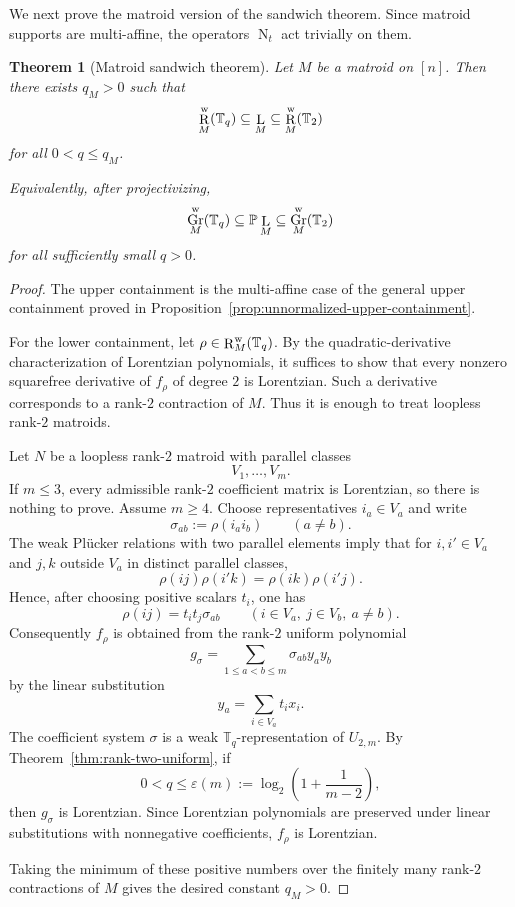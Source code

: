 \documentclass[12pt]{amsart}
\newtheorem{theorem}{Theorem}[section]
\theoremstyle{definition}
\newcommand{\1}{\mathbf{1}}
\DeclareMathOperator{\upN}{N}   %
\DeclareMathOperator{\upL}{L}   %
\DeclareMathOperator{\upR}{R}   %
\DeclareMathOperator{\Gr}{Gr}
\newcommand\T{{\mathbb T}}
\newcommand{\mk}[2][]{\todo[color=orange, #1]{\textbf{Mario}: #2}}
\begin{document}
We next prove the matroid version of the sandwich theorem.  Since matroid
supports are multi-affine, the operators $\upN_t$ act trivially on them.

\begin{theorem}[Matroid sandwich theorem]
\label{thm:matroid-sandwich}
Let $M$ be a matroid on $[n]$.  Then there exists $q_M>0$ such that
\[
\upR_M^{\rm w}(\T_q)\subseteq \upL_M \subseteq \upR_M^{\rm w}(\T_2)
\]
for all $0<q\le q_M$.

Equivalently, after projectivizing,
\[
\Gr_M^{\rm w}(\T_q)\subseteq \mathbb P\upL_M
\subseteq \Gr_M^{\rm w}(\T_2)
\]
for all sufficiently small $q>0$.
\end{theorem}

\begin{proof}
The upper containment is the multi-affine case of the general upper containment
proved in Proposition~\ref{prop:unnormalized-upper-containment}.

For the lower containment, let $\rho\in \upR_M^{\rm w}(\T_q)$.  By the
quadratic-derivative characterization of Lorentzian polynomials, it suffices to
show that every nonzero squarefree derivative of $f_\rho$ of degree $2$ is
Lorentzian.  Such a derivative corresponds to a rank-$2$ contraction of $M$.
Thus it is enough to treat loopless rank-$2$ matroids.

Let $N$ be a loopless rank-$2$ matroid with parallel classes
\[
V_1,\ldots,V_m.
\]
If $m\le 3$, every admissible rank-$2$ coefficient matrix is Lorentzian, so there
is nothing to prove.  Assume $m\ge 4$.  Choose representatives $i_a\in V_a$ and
write
\[
\sigma_{ab}:=\rho(i_ai_b)
\qquad (a\ne b).
\]
The weak Pl\"ucker relations with two parallel elements imply that for
$i,i'\in V_a$ and $j,k$ outside $V_a$ in distinct parallel classes,
\[
\rho(ij)\rho(i'k)=\rho(ik)\rho(i'j).
\]
Hence, after choosing positive scalars $t_i$, one has
\[
\rho(ij)=t_i t_j\sigma_{ab}
\qquad
(i\in V_a,\ j\in V_b,\ a\ne b).
\]
Consequently $f_\rho$ is obtained from the rank-$2$ uniform polynomial
\[
g_\sigma=\sum_{1\le a<b\le m}\sigma_{ab} y_ay_b
\]
by the linear substitution
\[
y_a=\sum_{i\in V_a} t_i x_i.
\]
The coefficient system $\sigma$ is a weak $\T_q$-representation of
$U_{2,m}$.  By Theorem~\ref{thm:rank-two-uniform}, if
\[
0<q\le \varepsilon(m):=\log_2\left(1+\frac1{m-2}\right),
\]
then $g_\sigma$ is Lorentzian.  Since Lorentzian polynomials are preserved under
linear substitutions with nonnegative coefficients, $f_\rho$ is Lorentzian.

Taking the minimum of these positive numbers over the finitely many rank-$2$
contractions of $M$ gives the desired constant $q_M>0$.
\end{proof}
\end{document}
